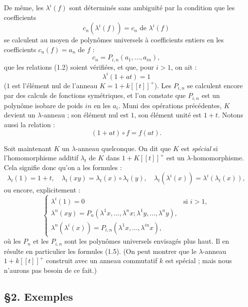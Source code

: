 \documentclass[11pt]{article}
\begin{document}
De même, les $\lambda^i(f)$ sont déterminés sans ambiguïté par la condition que les coefficients
\[
c_n(\lambda^i(f))=c_n\text{ de }\lambda^i(f)
\]
se calculent au moyen de polynômes universels à coefficients entiers en les coefficients $c_n(f)=a_n$ de $f$ :
\begin{equation}\tag{1.8}
c_n=P_{i,n}(a_1,\ldots,a_{in}),
\end{equation}
que les relations (1.2) soient vérifiées, et que, pour $i>1$, on ait :
\begin{equation}\tag{1.9}
\lambda^i(1+at)=1
\end{equation}
($1$ est l'élément nul de l'anneau $K=1+k[[t]]^+$). Les $P_{i,n}$ se calculent encore par des calculs de fonctions symétriques, et l'on constate que $P_{i,n}$ est un polynôme isobare de poids $in$ en les $a_i$. Muni des opérations précédentes, $K$ devient un $\lambda$-anneau ; son élément nul est $1$, son élément unité est $1+t$. Notons aussi la relation :
\begin{equation}\tag{1.7 bis}
(1+at)\circ f=f(at).
\end{equation}

Soit maintenant $K$ un $\lambda$-anneau quelconque. On dit que $K$ est \emph{spécial} si l'homomorphisme additif $\lambda_t$ de $K$ dans $1+K[[t]]^+$ est un $\lambda$-homomorphisme. Cela signifie donc qu'on a les formules :
\begin{equation}\tag{1.10}
\lambda_t(1)=1+t,\quad
\lambda_t(xy)=\lambda_t(x)\circ\lambda_t(y),\quad
\lambda_t(\lambda^i(x))=\lambda^i(\lambda_t(x)),
\end{equation}
ou encore, explicitement :
\begin{equation}\tag{1.11}
\begin{cases}
\lambda^i(1)=0 & \text{si }i>1,\\
\lambda^n(xy)=P_n(\lambda^1x,\ldots,\lambda^n x;\lambda^1y,\ldots,\lambda^n y),\\
\lambda^n(\lambda^i(x))=P_{i,n}(\lambda^1x,\ldots,\lambda^{in}x),
\end{cases}
\end{equation}
où les $P_n$ et les $P_{i,n}$ sont les polynômes universels envisagés plus haut. Il en résulte en particulier les formules (1.5). (On peut montrer que le $\lambda$-anneau $1+k[[t]]^+$ construit avec un anneau commutatif $k$ est spécial ; mais nous n'aurons pas besoin de ce fait.)

\subsection*{\S 2. Exemples}
\end{document}
